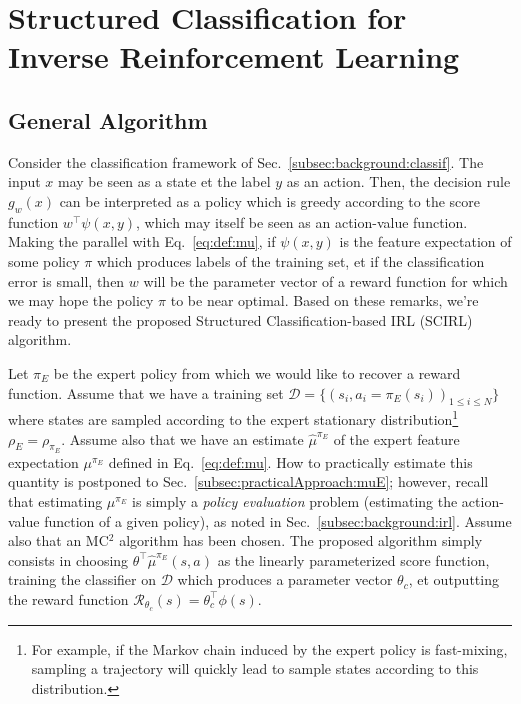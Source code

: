 \documentclass[english,utf8]{./hermes-journal}
\newcommand{\R}{\mathcal{R}}
\newcommand{\D}{\mathcal{D}}
\begin{document}
\section{Structured Classification for Inverse Reinforcement
Learning} \label{sec:scirl}

\subsection{General Algorithm}
\label{subsec:scirl:algo}

Consider the classification framework of
Sec.~\ref{subsec:background:classif}. The input $x$ may be seen as a
state et the label $y$ as an action. Then, the decision rule
$g_w(x)$ can be interpreted as a policy which is greedy according to
the score function $w^\top \psi(x,y)$, which may itself be seen as
an action-value function. Making the parallel with
Eq.~\eqref{eq:def:mu}, if $\psi(x,y)$ is the feature expectation of
some policy $\pi$ which produces labels of the training set, et if
the classification error is small, then $w$ will be the parameter
vector of a reward function for which we may hope the policy $\pi$
to be near optimal. Based on these remarks, we're ready to present
the proposed Structured Classification-based IRL (SCIRL) algorithm.

Let $\pi_E$ be the expert policy from which we would like to recover
a reward function. Assume that we have a training set $\D =
\{(s_i,a_i=\pi_E(s_i))_{1\leq i\leq N}\}$ where states are sampled
according to the expert stationary distribution\footnote{For
example, if the Markov chain induced by the expert policy is
fast-mixing, sampling a trajectory will quickly lead to sample
states according to this distribution.} $\rho_E = \rho_{\pi_E}$.
Assume also that we have an estimate $\hat{\mu}^{\pi_E}$ of the
expert feature expectation $\mu^{\pi_E}$ defined in
Eq.~\eqref{eq:def:mu}. How to practically estimate this quantity is
postponed to Sec.~\ref{subsec:practicalApproach:muE}; however,
recall that estimating $\mu^{\pi_E}$ is simply a \emph{policy
evaluation} problem (estimating the action-value function of a given
policy), as noted in Sec.~\ref{subsec:background:irl}. Assume also
that an MC$^2$ algorithm has been chosen. The proposed algorithm
simply consists in choosing $\theta^\top\hat{\mu}^{\pi_E}(s,a)$ as
the linearly parameterized score function, training the classifier
on $\D$ which produces a parameter vector $\theta_c$, et outputting
the reward function $\R_{\theta_c}(s) = \theta_c^\top \phi(s)$.
\end{document}
